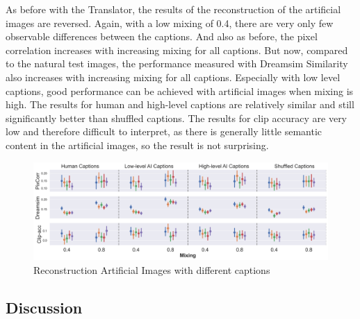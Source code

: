As before with the Translator, the results of the reconstruction of the artificial images are reversed. Again, with a low mixing of 0.4, there are very only few observable differences between the captions. And also as before, the pixel correlation increases with increasing mixing for all captions. But now, compared to the natural test images, the performance measured with Dreamsim Similarity also increases with increasing mixing for all captions. Especially with low level captions, good performance can be achieved with artificial images when mixing is high. The results for human and high-level captions are relatively similar and still significantly better than shuffled captions. The results for clip accuracy are very low and therefore difficult to interpret, as there is generally little semantic content in the artificial images, so the result is not surprising. 

\begin{figure}[ht]
    \centering
    \includegraphics[width=1\textwidth]{plots/aicap_reconstruction_art_both_mixings.png}
    \caption{Reconstruction Artificial Images with different captions}\label{fig:aicap_reconstruction_art_both_mixings}
\end{figure}




\subsection{Discussion}

